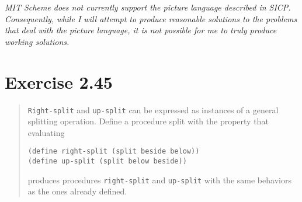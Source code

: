 \documentclass{article}
\begin{document}
\emph{MIT Scheme does not currently support the picture language described in
\emph{SICP}. Consequently, while I will attempt to produce reasonable solutions
to the problems that deal with the picture language, it is not possible for me
to truly produce working solutions.}



\section{Exercise 2.45}
\begin{quote}
    \texttt{Right-split} and \texttt{up-split} can be expressed as instances of
    a general splitting operation. Define a procedure split with the property
    that evaluating
    \begin{lstlisting}
(define right-split (split beside below))
(define up-split (split below beside))
    \end{lstlisting}
    produces procedures \texttt{right-split} and \texttt{up-split} with the same
    behaviors as the ones already defined.
\end{quote}


\end{document}
